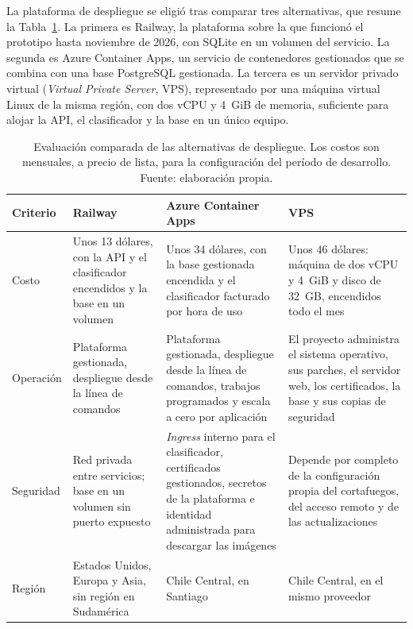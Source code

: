 La plataforma de despliegue se eligió tras comparar tres alternativas, que resume la Tabla~\ref{tab:despliegue-comparado}. La primera es Railway, la plataforma sobre la que funcionó el prototipo hasta noviembre de 2026, con SQLite en un volumen del servicio. La segunda es Azure Container Apps, un servicio de contenedores gestionados que se combina con una base PostgreSQL gestionada. La tercera es un servidor privado virtual (\textit{Virtual Private Server}, VPS), representado por una máquina virtual Linux de la misma región, con dos vCPU y 4~GiB de memoria, suficiente para alojar la API, el clasificador y la base en un único equipo.

\begin{table}[t]
  \centering
  \small
  \caption{Evaluación comparada de las alternativas de despliegue. Los costos son mensuales, a precio de lista, para la configuración del período de desarrollo. Fuente: elaboración propia.}
  \label{tab:despliegue-comparado}
  \begin{tabular}{p{2.0cm} p{3.9cm} p{3.9cm} p{3.9cm}}
    \hline
    \textbf{Criterio} & \textbf{Railway} & \textbf{Azure Container Apps} & \textbf{VPS} \\
    \hline
    Costo & Unos 13 dólares, con la API y el clasificador encendidos y la base en un volumen \parencite{RailwayPrecios2026} & Unos 34 dólares, con la base gestionada encendida y el clasificador facturado por hora de uso \parencite{MicrosoftAzureContainerApps2026} & Unos 46 dólares: máquina de dos vCPU y 4~GiB y disco de 32~GB, encendidos todo el mes \parencite{MicrosoftAzureMaquinas2026} \\
    Operación & Plataforma gestionada, despliegue desde la línea de comandos & Plataforma gestionada, despliegue desde la línea de comandos, trabajos programados y escala a cero por aplicación & El proyecto administra el sistema operativo, sus parches, el servidor web, los certificados, la base y sus copias de seguridad \\
    Seguridad & Red privada entre servicios; base en un volumen sin puerto expuesto & \textit{Ingress} interno para el clasificador, certificados gestionados, secretos de la plataforma e identidad administrada para descargar las imágenes & Depende por completo de la configuración propia del cortafuegos, del acceso remoto y de las actualizaciones \\
    Región & Estados Unidos, Europa y Asia, sin región en Sudamérica & Chile Central, en Santiago & Chile Central, en el mismo proveedor \\
    \hline
  \end{tabular}
\end{table}

